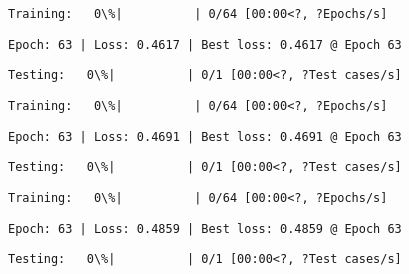 \documentclass[11pt]{article}
\begin{document}
    
    
    \begin{Verbatim}[commandchars=\\\{\}]
Training:   0\%|          | 0/64 [00:00<?, ?Epochs/s]
    \end{Verbatim}

    
    \begin{Verbatim}[commandchars=\\\{\}]
Epoch: 63 | Loss: 0.4617 | Best loss: 0.4617 @ Epoch 63
    \end{Verbatim}

    
    \begin{Verbatim}[commandchars=\\\{\}]
Testing:   0\%|          | 0/1 [00:00<?, ?Test cases/s]
    \end{Verbatim}

    
    
    \begin{Verbatim}[commandchars=\\\{\}]
Training:   0\%|          | 0/64 [00:00<?, ?Epochs/s]
    \end{Verbatim}

    
    \begin{Verbatim}[commandchars=\\\{\}]
Epoch: 63 | Loss: 0.4691 | Best loss: 0.4691 @ Epoch 63
    \end{Verbatim}

    
    \begin{Verbatim}[commandchars=\\\{\}]
Testing:   0\%|          | 0/1 [00:00<?, ?Test cases/s]
    \end{Verbatim}

    
    
    \begin{Verbatim}[commandchars=\\\{\}]
Training:   0\%|          | 0/64 [00:00<?, ?Epochs/s]
    \end{Verbatim}

    
    \begin{Verbatim}[commandchars=\\\{\}]
Epoch: 63 | Loss: 0.4859 | Best loss: 0.4859 @ Epoch 63
    \end{Verbatim}

    
    \begin{Verbatim}[commandchars=\\\{\}]
Testing:   0\%|          | 0/1 [00:00<?, ?Test cases/s]
    \end{Verbatim}
\end{document}
